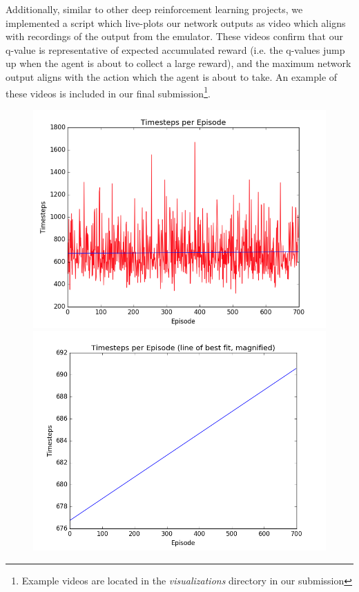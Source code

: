 \documentclass[paper=a4, fontsize=11pt]{scrartcl} %
\numberwithin{equation}{section} %
\numberwithin{figure}{section} %
\numberwithin{table}{section} %
\begin{document}
Additionally, similar to other deep reinforcement learning projects, we implemented a script which live-plots our network outputs as video which aligns with recordings of the output from the emulator. These videos confirm that our q-value is representative of expected accumulated reward (i.e. the q-values jump up when the agent is about to collect a large reward), and the maximum network output aligns with the action which the agent is about to take. An example of these videos is included in our final submission\footnote{Example videos are located in the \textit{visualizations} directory in our submission}.

\begin{figure}[h]
\includegraphics[scale=0.20]{timesteps_random}
\includegraphics[scale=0.275]{timesteps_random_line_of_best_fit}

\end{figure}
\end{document}
